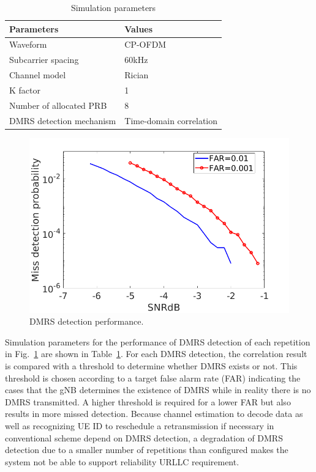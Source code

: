 \documentclass[conference]{IEEEtran}
\begin{document}
\begin{table}[htbp]
\caption{Simulation parameters}
\begin{center}
\begin{tabular}{|p{8em}|p{8em}|}
 \hline
 \textbf{Parameters} & \textbf{Values}\\
 \hline
 Waveform & CP-OFDM\\
 \hline
 Subcarrier spacing & 60kHz\\
 \hline
 Channel model & Rician\\
 \hline
 K factor & 1\\
 \hline
 Number of allocated PRB & 8\\
 \hline
 DMRS detection mechanism & Time-domain correlation\\
 

 
 \hline
\end{tabular}
\label{tab2}
\end{center}
\vspace{-6mm}
\end{table}

\begin{figure}[htbp]
\centerline{\includegraphics[scale=0.22]{fig2.png}}
\caption{DMRS detection performance.}
\label{fig5}
\vspace{-3mm}
\end{figure}

Simulation parameters for the performance of DMRS detection of each repetition in Fig.~\ref{fig5} are shown in Table~\ref{tab2}. For each DMRS detection, the correlation result is compared with a threshold to determine whether DMRS exists or not. This threshold is chosen according to a target false alarm rate (FAR) indicating the cases that the gNB determines the existence of DMRS while in reality there is no DMRS transmitted. A higher threshold is required for a lower FAR but also results in more missed detection. Because channel estimation to decode data as well as recognizing UE ID to reschedule a retransmission if necessary in conventional scheme depend on DMRS detection, a degradation of DMRS detection due to a smaller number of repetitions than configured makes the system not be able to support reliability URLLC requirement.
\end{document}
